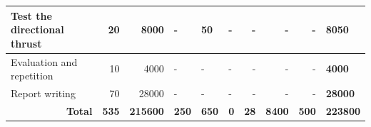 \begin{table}[H]
\begin{tabular}{|p{3.5cm}|rr|p{8mm}|p{8mm}|p{7mm}|rrr|p{8.5mm}|}
        Test the directional thrust                                                              & \multicolumn{1}{r|}{20}                              & 8000                                              & -                                                                                                       & 50                                                                                                     & -                                                                                                       & \multicolumn{1}{r|}{-}           & \multicolumn{1}{r|}{-}             & -                                      & \textbf{8050}                                        \\ \hline
        Evaluation and repetition                                                                & \multicolumn{1}{r|}{10}                              & 4000                                              & -                                                                                                       & -                                                                                                      & -                                                                                                       & \multicolumn{1}{r|}{-}           & \multicolumn{1}{r|}{-}             & -                                      & \textbf{4000}                                        \\ \hline
        Report writing                                                                           & \multicolumn{1}{r|}{70}                              & 28000                                             & -                                                                                                       & -                                                                                                      & -                                                                                                       & \multicolumn{1}{r|}{-}           & \multicolumn{1}{r|}{-}             & -                                      & \textbf{28000}                                       \\ \hline
        \multicolumn{1}{|r|}{\textbf{Total}}                                                     & \multicolumn{1}{r|}{\textbf{535}}                    & \textbf{215600}                                   & \textbf{250}                                                                                              & \textbf{650}                                                                                           & \textbf{0}                                                                                              & \multicolumn{1}{r|}{\textbf{28}} & \multicolumn{1}{r|}{\textbf{8400}} & \textbf{500}                         & \textbf{223800}                                      \\ \hline
        \end{tabular}
        \end{table}
